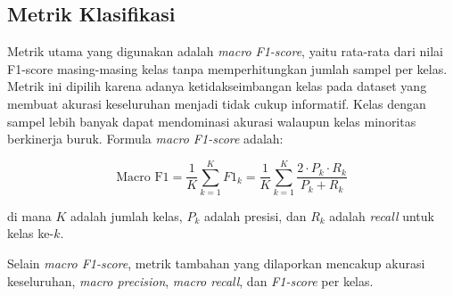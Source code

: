 \subsection{Metrik Klasifikasi}

Metrik utama yang digunakan adalah \textit{macro F1-score}, yaitu rata-rata dari nilai
F1-score masing-masing kelas tanpa memperhitungkan jumlah sampel per kelas. Metrik ini dipilih
karena adanya ketidakseimbangan kelas pada dataset yang membuat akurasi keseluruhan menjadi
tidak cukup informatif. Kelas dengan sampel lebih banyak dapat mendominasi akurasi walaupun kelas
minoritas berkinerja buruk. Formula \textit{macro F1-score} adalah:

\begin{equation}
  \text{Macro F1} = \frac{1}{K} \sum_{k=1}^{K} F1_k = \frac{1}{K} \sum_{k=1}^{K}
  \frac{2 \cdot P_k \cdot R_k}{P_k + R_k}
  \label{eq:macro_f1}
\end{equation}

\noindent di mana $K$ adalah jumlah kelas, $P_k$ adalah presisi, dan $R_k$ adalah \textit{recall}
untuk kelas ke-$k$.

Selain \textit{macro F1-score}, metrik tambahan yang dilaporkan mencakup akurasi keseluruhan,
\textit{macro precision}, \textit{macro recall}, dan \textit{F1-score} per kelas.


